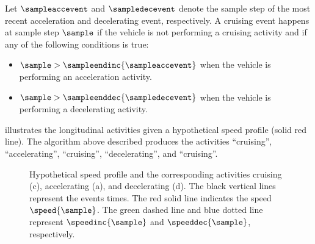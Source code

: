 
Let $\sampleaccevent$ and $\sampledecevent$ denote the sample step of the most recent acceleration and decelerating event, respectively. A cruising event happens at sample step $\sample$ if the vehicle is not performing a cruising activity and if any of the following conditions is true:
\begin{itemize}
	\item $\sample > \sampleendinc{\sampleaccevent}$ when the vehicle is performing an acceleration activity.
	\item $\sample > \sampleenddec{\sampledecevent}$ when the vehicle is performing a decelerating activity.
\end{itemize}

\cstarta%
 illustrates the longitudinal activities given a hypothetical speed profile (solid red line). The algorithm above described produces the activities ``cruising'', ``accelerating'', ``cruising'', ``decelerating'', and ``cruising''.
\cenda

\setlength{\figurewidth}{\linewidth}
\setlength{\figureheight}{0.7\linewidth}
\begin{figure}
	\centering
	
	\caption{\cstarta Hypothetical speed profile and the corresponding activities cruising (c), accelerating (a), and decelerating (d). The black vertical lines represent the events times. The red solid line indicates the speed $\speed{\sample}$. The green dashed line and blue dotted line represent $\speedinc{\sample}$ and $\speeddec{\sample}$, respectively.\cenda}
	\label{fig:longitudinal activities}
\end{figure}


